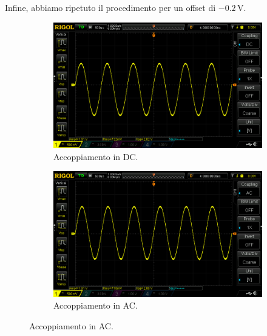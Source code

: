 \documentclass[a4paper]{article}
\begin{document}
				\newline
				Infine, abbiamo ripetuto il procedimento per un offset di $ - 0.2 \, \mathrm{V} $.
				\begin{figure}[h!]
					\centering
					\begin{subfigure}{0.4\textwidth}
						\centering
						\includegraphics[scale=0.2]{offsetNegativoDC}
						\caption{Accoppiamento in DC.}
					\end{subfigure}
					\begin{subfigure}{0.4\textwidth}
						\centering
						\includegraphics[scale=0.2]{offsetNegativoAC}
						\caption{Accoppiamento in AC.}
					\end{subfigure}
					\label{fig:offsetNegativo}
				\end{figure}
\end{document}

